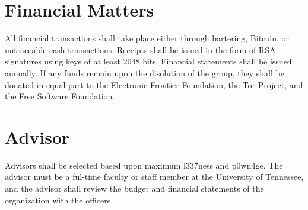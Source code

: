 \documentclass[12pt]{article}
\begin{document}
\section*{Financial Matters}
All financial transactions shall take place either through bartering, Bitcoin, or untraceable cash transactions.  Receipts shall be issued in the form of RSA signatures using keys of at least 2048 bits.  Financial statements shall be issued annually.  If any funds remain upon the disolution of the group, they shall be donated in equal part to the Electronic Frontier Foundation, the Tor Project, and the Free Software Foundation.

\section*{Advisor}
Advisors shall be selected based upon maximum l337ness and p0wn4ge.  The advisor must be a ful-time faculty or staff member at the University of Tennessee, and the advisor shall review the budget and financial statements of the organization with the officers.
\end{document}
